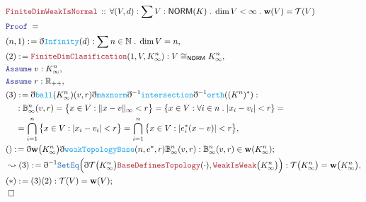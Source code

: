 \documentclass[12pt]{scrartcl}
\newcommand{\TYPE}[1]{\textcolor{NavyBlue}{\mathtt{#1}}}
\newcommand{\FUNC}[1]{\textcolor{Cerulean}{\mathtt{#1}}}
\newcommand{\LOGIC}[1]{\textcolor{Blue}{\mathtt{#1}}}
\newcommand{\THM}[1]{\textcolor{Maroon}{\mathtt{#1}}}
\renewcommand{\.}{\; . \;}
\newcommand{\de}{: \kern 0.1pc =}
\newcommand{\Theorem}[2]{& \THM{#1} \, :: \, #2 \\ & \Proof = \\ }
\newcommand{\NewLine}{\\ & \kern 1pc}
\newcommand{\Page}[1]{\begin{align*} #1 \end{align*} \newpage   }
\newcommand{ \bd }{ \ByDef }
\newcommand{\Reals}{\mathbb{R} }
\newcommand{\Nat}{\mathbb{N} }
\newcommand{\Say}[3]{& #1 \de #2 : #3, \\}
\newcommand{\Conclude}[3]{& #1 \de #2 : #3; \\}
\newcommand{\Derive}[3]{& \leadsto #1 \de #2 : #3, \\}
\newcommand{\A}{\LOGIC{Assume} \;}
\newcommand{\Assume}[2]{& \A #1 : #2, \\}
\newcommand{\QED}{\; \square}
\newcommand{\EndProof}{& \QED \\}
\newcommand{\ByDef}{\eth}
\newcommand{\Proof}{\LOGIC{Proof} \; }
\newcommand{\NORM}{\textsf{NORM}}
\begin{document}
\Page{
\Theorem{FiniteDimWeakIsNormal}{\forall (V,d) : \sum V : \NORM(K) \. \dim V < \infty \.  \mathbf{w}(V) = \mathcal{T}(V) }
\Say{(n,1)}{\bd \FUNC{Infinity}(d)}{\sum n \in \Nat \. \dim V = n}
\Say{(2)}{\THM{FiniteDimClasification}(1,V,K^n_\infty)}{V \cong_{\NORM} K^n_\infty}
\Assume{v}{K^n_\infty}
\Assume{r}{\Reals_{++}}
\Say{(3)}{\bd \FUNC{ball}(K^n_\infty)(v,r) \bd \FUNC{maxnorm} \bd^{-1} \FUNC{intersection} \bd^{-1} \FUNC{orth}((K^n)^*)  }{
\NewLine :
 \mathbb{B}_\infty^n(v,r) = \big\{ x \in V : \| x - v \|_\infty < r  \big\} = \left\{ x \in V : \forall i \in n \. | x_i - v_i| < r  \right\} = \NewLine = 
  \bigcap^n_{i = 1} \big\{ x \in V : | x_i - v_i | < r \big\} 
 = \bigcap^n_{i = 1} \big\{ x \in V : |  e_i^* ( x - v)  | < r \big\} }
\Conclude{()}{\bd \mathbf{w}\big(K^n_\infty \big) \bd \FUNC{weakTopologyBase}(n,e^*,r) \mathbb{B}_\infty^n(v,r)}{ \mathbb{B}_\infty^n(v,r) \in \mathbf{w}(K^n_\infty)}
\Derive{(3)}{\bd^{-1}\TYPE{SetEq}\Big( \bd \mathcal{T}\big( K^n_{\infty} \big)\THM{BaseDefinesTopology}(\cdot), \THM{WeakIsWeak}\big( K^n_\infty \big)\Big)}{\mathcal{T}\big(K^n_{\infty}\big) = \mathbf{w}\big( K^n_\infty \big)}
\Conclude{(*)}{(3)(2)}{\mathcal{T}(V) = \mathbf{w}(V)}
\EndProof 
}
\end{document}
